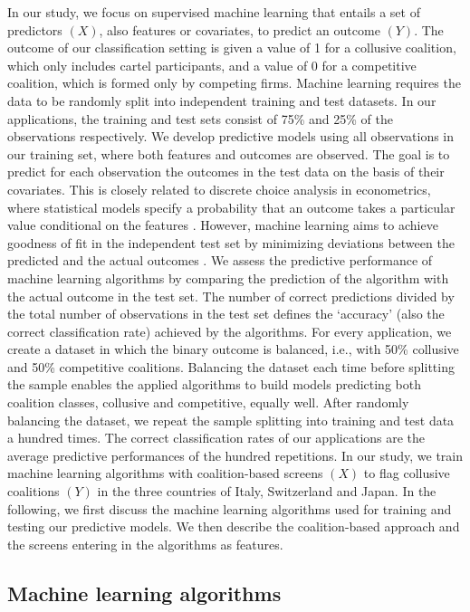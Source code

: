 \documentclass[a4paper,11pt]{article}
\begin{document}
	In our study, we focus on supervised machine learning that entails a set of predictors $(X)$, also features or covariates, to predict an outcome $(Y)$. The outcome of our classification setting is given a value of 1 for a collusive coalition, which only includes cartel participants, and a value of 0 for a competitive coalition, which is formed only by competing firms. Machine learning requires the data to be randomly split into independent training and test datasets. In our applications, the training and test sets consist of 75\% and 25\% of the observations respectively. We develop predictive models using all observations in our training set, where both features and outcomes are observed. The goal is to predict for each observation the outcomes in the test data on the basis of their covariates. This is closely related to discrete choice analysis in econometrics, where statistical models specify a probability that an outcome takes a particular value conditional on the features \citep[][]{athey2019machine}. However, machine learning aims to achieve goodness of fit in the independent test set by minimizing deviations between the predicted and the actual outcomes \citep[][]{athey2019}. 
	We assess the predictive performance of machine learning algorithms by comparing the prediction of the algorithm with the actual outcome in the test set. The number of correct predictions divided by the total number of observations in the test set defines the ‘accuracy’ (also the correct classification rate) achieved by the algorithms. For every application, we create a dataset in which the binary outcome is balanced, i.e., with 50\% collusive and 50\% competitive coalitions. Balancing the dataset each time before splitting the sample enables the applied algorithms to build models predicting both coalition classes, collusive and competitive, equally well. After randomly balancing the dataset, we repeat the sample splitting into training and test data a hundred times. The correct classification rates of our applications are the average predictive performances of the hundred repetitions. 
	In our study, we train machine learning algorithms with coalition-based screens $(X)$ to flag collusive coalitions $(Y)$ in the three countries of Italy, Switzerland and Japan. In the following, we first discuss the machine learning algorithms used for training and testing our predictive models. We then describe the coalition-based approach and the screens entering in the algorithms as features. 
	
	\subsection{Machine learning algorithms}
	
\end{document}

